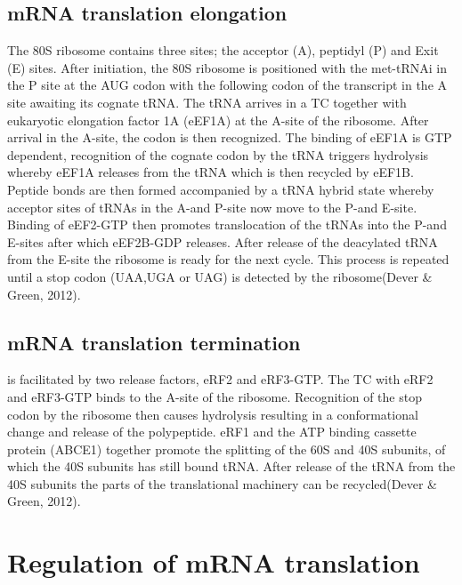 \documentclass[
  12pt,
  openany]{book}
\begin{document}
\subsection{mRNA translation elongation}

The 80S ribosome contains three sites; the acceptor (A), peptidyl (P) and Exit (E) sites. After initiation, the 80S ribosome is positioned with the met-tRNAi in the P site at the AUG codon with the following codon of the transcript in the A site awaiting its cognate tRNA. The tRNA arrives in a TC together with eukaryotic elongation factor 1A (eEF1A) at the A-site of the ribosome. After arrival in the A-site, the codon is then recognized. The binding of eEF1A is GTP dependent, recognition of the cognate codon by the tRNA triggers hydrolysis whereby eEF1A releases from the tRNA which is then recycled by eEF1B. Peptide bonds are then formed accompanied by a tRNA hybrid state whereby acceptor sites of tRNAs in the A-and P-site now move to the P-and E-site. Binding of eEF2-GTP then promotes translocation of the tRNAs into the P-and E-sites after which eEF2B-GDP releases. After release of the deacylated tRNA from the E-site the ribosome is ready for the next cycle. This process is repeated until a stop codon (UAA,UGA or UAG) is detected by the ribosome(Dever \& Green, 2012).

\subsection{mRNA translation termination}

is facilitated by two release factors, eRF2 and eRF3-GTP. The TC with eRF2 and eRF3-GTP binds to the A-site of the ribosome. Recognition of the stop codon by the ribosome then causes hydrolysis resulting in a conformational change and release of the polypeptide. eRF1 and the ATP binding cassette protein (ABCE1) together promote the splitting of the 60S and 40S subunits, of which the 40S subunits has still bound tRNA. After release of the tRNA from the 40S subunits the parts of the translational machinery can be recycled(Dever \& Green, 2012).

\section{Regulation of mRNA translation}
\end{document}
